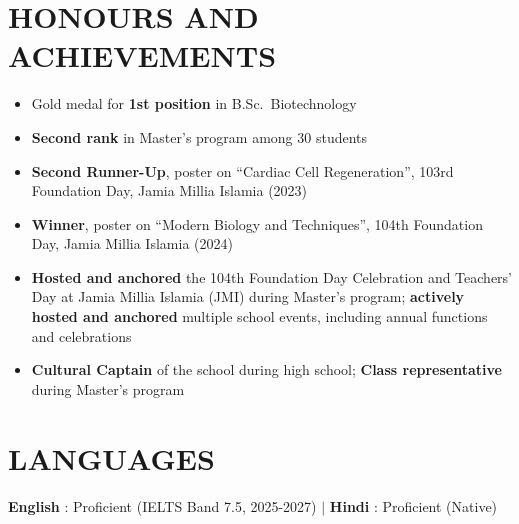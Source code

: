 \documentclass[letterpaper,11pt]{article}
\begin{document}
\section{HONOURS AND ACHIEVEMENTS}
\begin{itemize}[leftmargin=0.15in]
  \item \small Gold medal for \textbf{1st position} in B.Sc.\ Biotechnology
  \item \small \textbf{Second rank} in Master's program among 30 students
  \item \small \textbf{Second Runner-Up}, poster on ``Cardiac Cell Regeneration'', 103rd Foundation Day, Jamia Millia Islamia (2023)
  \item \small \textbf{Winner}, poster on ``Modern Biology and Techniques'', 104th Foundation Day, Jamia Millia Islamia (2024)
  \item \small \textbf{Hosted and anchored} the 104th Foundation Day Celebration and Teachers' Day at Jamia Millia Islamia (JMI) during Master’s program; \textbf{actively hosted and anchored} multiple school events, including annual functions and celebrations
  \item \small \textbf{Cultural Captain} of the school during high school; \textbf{Class representative} during Master’s program
\end{itemize}
\vspace{-2mm}

\section{LANGUAGES}
\begin{itemize}[leftmargin=0in, label={}]
  \small{\item{
    \textbf{English} {: Proficient (IELTS Band 7.5, 2025-2027)} \hspace{6pt} $|$ \hspace{6pt}
    \textbf{Hindi} {: Proficient (Native)}
  }}
\end{itemize}

\end{document}
